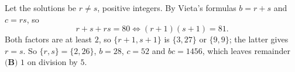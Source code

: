 Let the solutions be $r\ne s$, positive integers. By Vieta's formulas $b=r+s$ and $c=rs$, so
\[r+s+rs=80\iff(r+1)(s+1)=81.\]
Both factors are at least $2$, so $\{r+1,s+1\}$ is $\{3,27\}$ or $\{9,9\}$; the latter gives $r=s$. So $\{r,s\}=\{2,26\}$, $b=28$, $c=52$ and $bc=1456$, which leaves remainder $\boxed{\textbf{(B) }1}$ on division by $5$.
